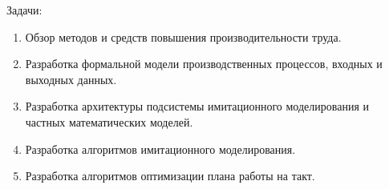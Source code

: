 Задачи: 
\begin{enumerate}
    \item Обзор методов и средств повышения производительности труда.
    \item Разработка формальной модели производственных процессов, входных и выходных данных.
    \item Разработка архитектуры подсистемы имитационного моделирования и частных математических моделей.
    \item Разработка алгоритмов имитационного моделирования.
    \item Разработка алгоритмов оптимизации плана работы на такт.
\end{enumerate}